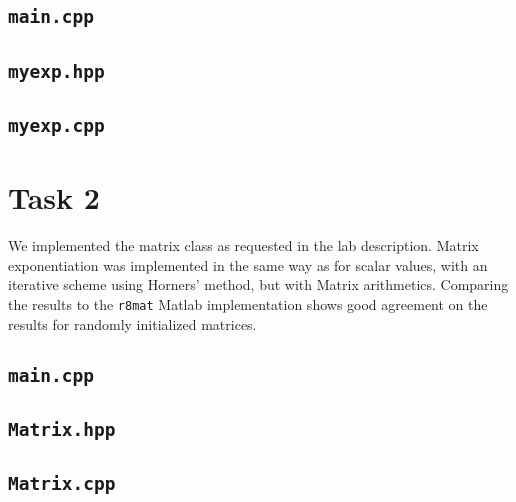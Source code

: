 \documentclass[12pt]{article}
\begin{document}
\subsection*{\texttt{main.cpp}}

\subsection*{\texttt{myexp.hpp}}

\subsection*{\texttt{myexp.cpp}}

\newpage

\section{Task 2}

We implemented the matrix class as requested in the lab description. Matrix exponentiation was implemented in the same way as for scalar values, with an iterative scheme using Horners' method, but with Matrix arithmetics. Comparing the results to the \texttt{r8mat} Matlab implementation shows good agreement on the results for randomly initialized matrices.

\subsection*{\texttt{main.cpp}}

\subsection*{\texttt{Matrix.hpp}}

\subsection*{\texttt{Matrix.cpp}}

\end{document}
